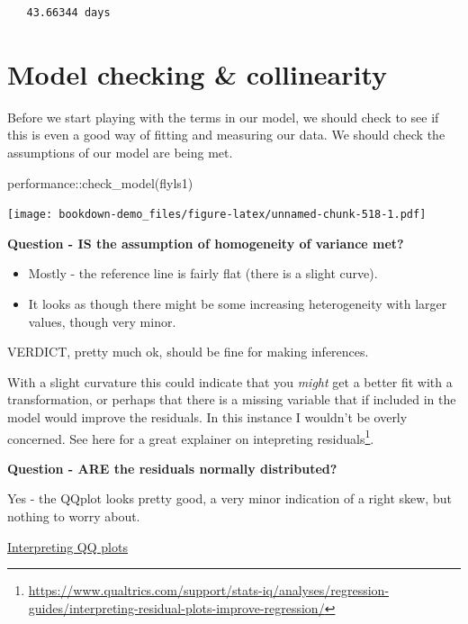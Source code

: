 \documentclass[
]{book}
\newenvironment{Shaded}{\begin{snugshade}}{\end{snugshade}}
\newcommand{\FunctionTok}[1]{\textcolor[rgb]{0.00,0.00,0.00}{#1}}
\newcommand{\NormalTok}[1]{#1}
\newcommand{\SpecialCharTok}[1]{\textcolor[rgb]{0.00,0.00,0.00}{#1}}
\begin{document}
\begin{verbatim}
   43.66344 days
\end{verbatim}

\hypertarget{model-checking-collinearity}{%
\section{Model checking \& collinearity}\label{model-checking-collinearity}}

Before we start playing with the terms in our model, we should check to see if this is even a good way of fitting and measuring our data. We should check the assumptions of our model are being met.

\begin{Shaded}
\begin{Highlighting}[]
\NormalTok{performance}\SpecialCharTok{::}\FunctionTok{check\_model}\NormalTok{(flyls1)}
\end{Highlighting}
\end{Shaded}

\texttt{[image: bookdown-demo\_files/figure-latex/unnamed-chunk-518-1.pdf]}

\textbf{Question - IS the assumption of homogeneity of variance met?}

\begin{itemize}
\item
  Mostly - the reference line is fairly flat (there is a slight curve).
\item
  It looks as though there might be some increasing heterogeneity with larger values, though very minor.
\end{itemize}

VERDICT, pretty much ok, should be fine for making inferences.

With a slight curvature this could indicate that you \emph{might} get a better fit with a transformation, or perhaps that there is a missing variable that if included in the model would improve the residuals. In this instance I wouldn't be overly concerned. See here for a great explainer on intepreting residuals\footnote{\url{https://www.qualtrics.com/support/stats-iq/analyses/regression-guides/interpreting-residual-plots-improve-regression/}}.

\textbf{Question - ARE the residuals normally distributed?}

Yes - the QQplot looks pretty good, a very minor indication of a right skew, but nothing to worry about.

\protect\hyperlink{what-is-a-quantile-quantile-qq-plot}{Interpreting QQ plots}
\end{document}
